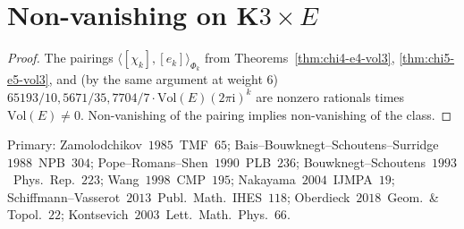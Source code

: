 \section{Non-vanishing on K$3\times E$}
\label{sec:non-vanishing-vol3}


\begin{proof}
The pairings
$\langle[\chi_k],[e_k]\rangle_{\Phi_k}$ from
Theorems~\ref{thm:chi4-e4-vol3}, \ref{thm:chi5-e5-vol3}, and
(by the same argument at weight $6$)
$65193/10,5671/35,7704/7\cdot{}(E)(2\pi\mathrm i)^k$
are nonzero rationals times $(E)$.
Non-vanishing of the pairing implies non-vanishing of the class.
\end{proof}

Primary:
Zamolodchikov~$1985$~TMF~$65$;
Bais--Bouwknegt--Schoutens--Surridge~$1988$~NPB~$304$;
Pope--Romans--Shen~$1990$~PLB~$236$;
Bouwknegt--Schoutens~$1993$~Phys.\ Rep.~$223$;
Wang~$1998$~CMP~$195$;
Nakayama~$2004$~IJMPA~$19$;
Schiffmann--Vasserot~$2013$~Publ.\ Math.\ IHES~$118$;
Oberdieck~$2018$~Geom.\ \& Topol.~$22$;
Kontsevich~$2003$~Lett.\ Math.\ Phys.~$66$.
